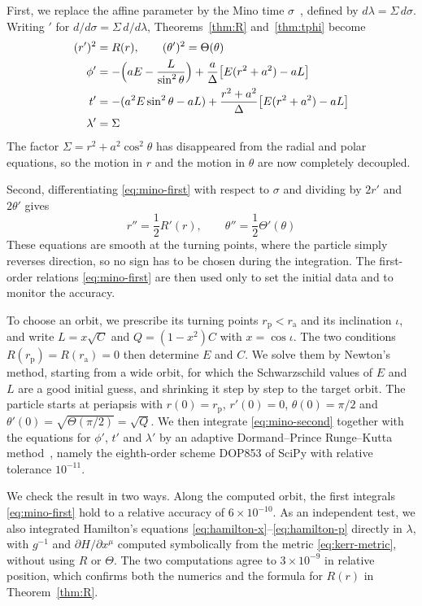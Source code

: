 \documentclass{article}
\theoremstyle{remark}
\begin{document}
First, we replace the affine parameter by the Mino time $\sigma$~\cite{mino}, defined by $d\lambda = \Sigma\, d\sigma$. Writing $'$ for $d/d\sigma = \Sigma\, d/d\lambda$, Theorems~\ref{thm:R} and~\ref{thm:tphi} become
\begin{align}
    (r')^2 &= R(r), \qquad (\theta')^2 = \Theta(\theta) \label{eq:mino-first}\\
    \phi' &= -\Bigl(aE-\frac{L}{\sin^2\theta}\Bigr)+\frac{a}{\Delta}\bigl[E(r^2+a^2)-aL\bigr]\\
    t' &= -(a^2E\sin^2\theta-aL)+\frac{r^2+a^2}{\Delta}\bigl[E(r^2+a^2)-aL\bigr]\\
    \lambda' &= \Sigma
\end{align}
The factor $\Sigma = r^2 + a^2\cos^2\theta$ has disappeared from the radial and polar equations, so the motion in $r$ and the motion in $\theta$ are now completely decoupled.

Second, differentiating \eqref{eq:mino-first} with respect to $\sigma$ and dividing by $2r'$ and $2\theta'$ gives
\begin{equation}\label{eq:mino-second}
    r'' = \frac{1}{2}R'(r), \qquad \theta'' = \frac{1}{2}\Theta'(\theta)
\end{equation}
These equations are smooth at the turning points, where the particle simply reverses direction, so no sign has to be chosen during the integration. The first-order relations \eqref{eq:mino-first} are then used only to set the initial data and to monitor the accuracy.

To choose an orbit, we prescribe its turning points $r_{\mathrm{p}} < r_{\mathrm{a}}$ and its inclination $\iota$, and write $L = x\sqrt{C}$ and $Q = (1-x^2)C$ with $x = \cos\iota$. The two conditions $R(r_{\mathrm{p}}) = R(r_{\mathrm{a}}) = 0$ then determine $E$ and $C$. We solve them by Newton's method, starting from a wide orbit, for which the Schwarzschild values of $E$ and $L$ are a good initial guess, and shrinking it step by step to the target orbit. The particle starts at periapsis with $r(0) = r_{\mathrm{p}}$, $r'(0) = 0$, $\theta(0) = \pi/2$ and $\theta'(0) = \sqrt{\Theta(\pi/2)} = \sqrt{Q}$. We then integrate \eqref{eq:mino-second} together with the equations for $\phi'$, $t'$ and $\lambda'$ by an adaptive Dormand--Prince Runge--Kutta method~\cite{hairer}, namely the eighth-order scheme DOP853 of SciPy with relative tolerance $10^{-11}$.

We check the result in two ways. Along the computed orbit, the first integrals \eqref{eq:mino-first} hold to a relative accuracy of $6\times 10^{-10}$. As an independent test, we also integrated Hamilton's equations \eqref{eq:hamilton-x}--\eqref{eq:hamilton-p} directly in $\lambda$, with $g^{-1}$ and $\partial H/\partial x^{\mu}$ computed symbolically from the metric \eqref{eq:kerr-metric}, without using $R$ or $\Theta$. The two computations agree to $3\times 10^{-9}$ in relative position, which confirms both the numerics and the formula for $R(r)$ in Theorem~\ref{thm:R}.
\end{document}
